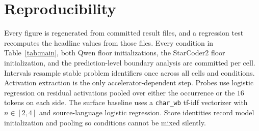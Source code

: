 \documentclass{article}
\begin{document}
\appendix
\raggedbottom


\FloatBarrier
{}
\section{Reproducibility}
\label{app:repro}
Every figure is regenerated from committed result files, and a regression test
recomputes the headline values from those files. Every condition in
Table~\ref{tab:main}, both Qwen floor initializations, the StarCoder2 floor
initialization, and the prediction-level boundary analysis are committed per
cell. Intervals resample stable problem identifiers once across all cells and
conditions. Activation extraction is the only accelerator-dependent step.
Probes use logistic regression on residual activations pooled over either the
occurrence or the $16$ tokens on each side. The surface baseline uses a
\texttt{char\_wb} tf-idf vectorizer with $n \in [2,4]$ and source-language
logistic regression. Store identities record model initialization and pooling
so conditions cannot be mixed silently.


\end{document}
